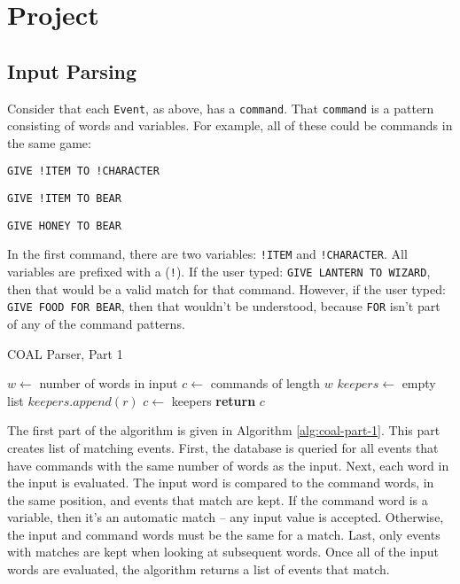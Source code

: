 \documentclass{article}
\newcommand{\enterProblemHeader}[1]{
}
\newcommand{\exitProblemHeader}[1]{
\nobreak\extramarks{#1}{}\nobreak
}
\newcounter{homeworkProblemCounter} %
\newcommand{\homeworkProblemName}{}
\newenvironment{homeworkProblem}[1][Problem \arabic{homeworkProblemCounter}]{ %
\stepcounter{homeworkProblemCounter} %
\renewcommand{\homeworkProblemName}{#1} %
\section{\homeworkProblemName} %
\enterProblemHeader{\homeworkProblemName} %
}{
\exitProblemHeader{\homeworkProblemName} %
}
\newcommand{\homeworkSectionName}{}
\newenvironment{homeworkSection}[1]{ %
\renewcommand{\homeworkSectionName}{#1} %
\subsection{\homeworkSectionName} %
\enterProblemHeader{\homeworkProblemName\ [\homeworkSectionName]} %
}{
\enterProblemHeader{\homeworkProblemName} %
}
\begin{document}
\begin{homeworkProblem}[Project]
\begin{homeworkSection}{Input Parsing}
	Consider that each \texttt{Event}, as above, has a \texttt{command}. That \texttt{command} is a pattern consisting of words and variables. For example, all of these could be commands in the same game:

	\begin{compactitem}
		\item \texttt{GIVE !ITEM TO !CHARACTER}
		\item \texttt{GIVE !ITEM TO BEAR}
		\item \texttt{GIVE HONEY TO BEAR}
	\end{compactitem}

	In the first command, there are two variables: \texttt{!ITEM} and \texttt{!CHARACTER}. All variables are prefixed with a (\texttt{!}). If the user typed: \texttt{GIVE LANTERN TO WIZARD}, then that would be a valid match for that command. However, if the user typed: \texttt{GIVE FOOD FOR BEAR}, then that wouldn't be understood, because \texttt{FOR} isn't part of any of the command patterns.

	\begin{algorithm}
		\caption{COAL Parser, Part 1}
		\label{alg:coal-part-1}
		\begin{algorithmic}
				\State $w \gets$ number of words in input
				\State $c \gets$ commands of length $w$
					\State $keepers \gets$ empty list
							\State $keepers.append(r)$
						\EndIf
					\EndFor
					\State $c \gets$ keepers
				\EndFor
				\State \textbf{return} $c$
			\EndProcedure
	\end{algorithmic}
	\end{algorithm}

	The first part of the algorithm is given in Algorithm \ref{alg:coal-part-1}. This part creates list of matching events. First, the database is queried for all events that have commands with the same number of words as the input. Next, each word in the input is evaluated. The input word is compared to the command words, in the same position, and events that match are kept. If the command word is a variable, then it's an automatic match -- any input value is accepted. Otherwise, the input and command words must be the same for a match. Last, only events with matches are kept when looking at subsequent words. Once all of the input words are evaluated, the algorithm returns a list of events that match.
	

\end{homeworkSection}
\end{homeworkProblem}
\end{document}
